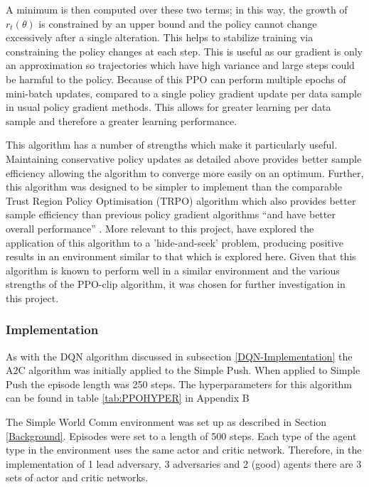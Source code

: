 \documentclass{article}
\begin{document}
A minimum is then computed over these two terms; in this way, the growth of $r_t(\theta)$ is constrained by an upper bound and the policy cannot change excessively after a single alteration.
This helps to stabilize training via constraining the policy changes at each step. This is useful as our gradient is only an approximation so trajectories which have high variance and large steps could be harmful to the policy.
Because of this PPO can perform multiple epochs of mini-batch updates, compared to a single policy gradient update per data sample in usual policy gradient methods.
This allows for greater learning per data sample and therefore a greater learning performance.

This algorithm has a number of strengths which make it particularly useful.
Maintaining conservative policy updates as detailed above provides better sample efficiency allowing the algorithm to converge more easily on an optimum.
Further, this algorithm was designed to be simpler to implement than the comparable Trust Region Policy Optimisation (TRPO) algorithm \citet{trustregionpolicy} which also provides better sample efficiency than previous policy gradient algorithms “and have better overall performance” \citet{PPOAlgo}.
More relevant to this project, \citet{emergenttoolusage} have explored the application of this algorithm to a 'hide-and-seek' problem, producing positive results in an environment similar to that which is explored here.
Given that this algorithm is known to perform well in a similar environment and the various strengths of the PPO-clip algorithm, it was chosen for further investigation in this project.

\subsubsection{Implementation} \label{A2C-Implementation}

As with the DQN algorithm discussed in subsection \ref{DQN-Implementation} the A2C algorithm was initially applied to the Simple Push.
When applied to Simple Push the episode length was 250 steps.
The hyperparameters for this algorithm can be found in table \ref{tab:PPOHYPER} in Appendix B

The Simple World Comm environment was set up as described in Section \ref{Background}.
Episodes were set to a length of 500 steps.
Each type of the agent type in the environment uses the same actor and critic network.
Therefore, in the implementation of 1 lead adversary, 3 adversaries and 2 (good) agents there are 3 sets of actor and critic networks.
\end{document}
